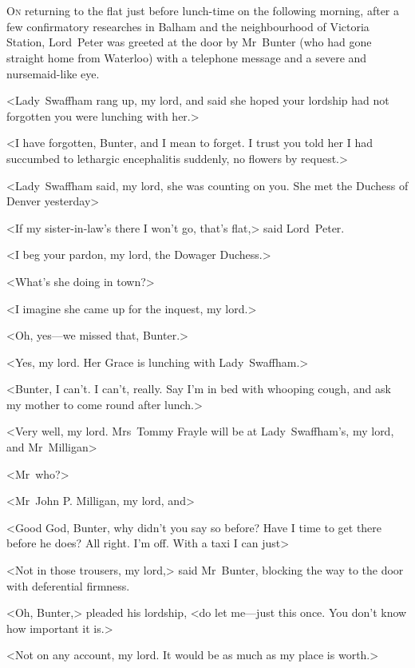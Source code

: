 \chapter[Chapter \thechapter]{}
\lettrine{O}{n} returning to the flat just before lunch-time on the following morning, after a few confirmatory researches in Balham and the neighbourhood of Victoria Station, Lord~Peter was greeted at the door by Mr~Bunter (who had gone straight home from Waterloo) with a telephone message and a severe and nursemaid-like eye.

<Lady~Swaffham rang up, my lord, and said she hoped your lordship had not forgotten you were lunching with her.>

<I have forgotten, Bunter, and I mean to forget. I trust you told her I had succumbed to lethargic encephalitis suddenly, no flowers by request.>

<Lady~Swaffham said, my lord, she was counting on you. She met the Duchess of Denver yesterday\longdash>

<If my sister-in-law's there I won't go, that's flat,> said Lord~Peter.

<I beg your pardon, my lord, the Dowager Duchess.>

<What's she doing in town?>

<I imagine she came up for the inquest, my lord.>

<Oh, yes—we missed that, Bunter.>

<Yes, my lord. Her Grace is lunching with Lady~Swaffham.>

<Bunter, I can't. I can't, really. Say I'm in bed with whooping cough, and ask my mother to come round after lunch.>

<Very well, my lord. Mrs~Tommy Frayle will be at Lady~Swaffham's, my lord, and Mr~Milligan\longdash>

<Mr~who?>

<Mr~John P\@. Milligan, my lord, and\longdash>

<Good God, Bunter, why didn't you say so before? Have I time to get there before he does? All right. I'm off. With a taxi I can just\longdash>

<Not in those trousers, my lord,> said Mr~Bunter, blocking the way to the door with deferential firmness.

<Oh, Bunter,> pleaded his lordship, <do let me—just this once. You don't know how important it is.>

<Not on any account, my lord. It would be as much as my place is worth.>

